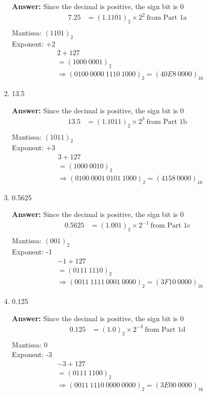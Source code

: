 \documentclass[12pt]{article}
\begin{document}
\begin{enumerate}
\begin{enumerate}
      \textbf{Answer:}
      Since the decimal is positive, the sign bit is 0
      \begin{align*}
        7.25 &= (1.1101)_2 \times 2^{2} \ \text{from Part 1a}\\
      \end{align*}
      Mantissa: $(1101)_2$ \\
      Exponent: +2
      \begin{align*}
        &2 + 127 \\
        &= (1000 \ 0001)_2 \\
        &\Rightarrow (0100 \ 0000 \ 1110 \ 1000)_2 = (40E8 \ 0000)_{16}
      \end{align*}

      \item 13.5

      \textbf{Answer:}
      Since the decimal is positive, the sign bit is 0
      \begin{align*}
        13.5 &= (1.1011)_2 \times 2^{3} \ \text{from Part 1b}\\
      \end{align*}
      Mantissa: $(1011)_2$ \\
      Exponent: +3
      \begin{align*}
        &3 + 127 \\
        &= (1000 \ 0010)_2 \\
        &\Rightarrow (0100 \ 0001 \ 0101 \ 1000)_2 = (4158 \ 0000)_{16}
      \end{align*}

      \item 0.5625

      \textbf{Answer:}
      Since the decimal is positive, the sign bit is 0
      \begin{align*}
        0.5625 &= (1.001)_2 \times 2^{-1} \ \text{from Part 1c}\\
      \end{align*}
      Mantissa: $(001)_2$ \\
      Exponent: -1
      \begin{align*}
        &-1 + 127 \\
        &= (0111 \ 1110)_2 \\
        &\Rightarrow (0011 \ 1111 \ 0001 \ 0000)_2 = (3F10 \ 0000)_{16}
      \end{align*}

      \item 0.125

      \textbf{Answer:}
      Since the decimal is positive, the sign bit is 0
      \begin{align*}
        0.125 &= (1.0)_2 \times 2^{-3} \ \text{from Part 1d}\\
      \end{align*}
      Mantissa: 0 \\
      Exponent: -3
      \begin{align*}
        &-3 + 127 \\
        &= (0111 \ 1100)_2 \\
        &\Rightarrow (0011 \ 1110 \ 0000 \ 0000)_2 = (3E00 \ 0000)_{16}
      \end{align*}


\end{enumerate}
\end{enumerate}
\end{document}
